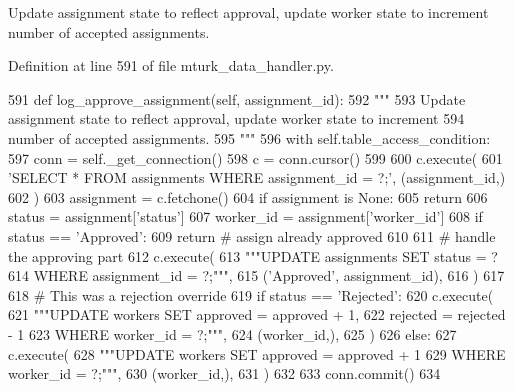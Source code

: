 \begin{DoxyVerb}Update assignment state to reflect approval, update worker state to increment
number of accepted assignments.
\end{DoxyVerb}
 

Definition at line 591 of file mturk\+\_\+data\+\_\+handler.\+py.


\begin{DoxyCode}
591     \textcolor{keyword}{def }log\_approve\_assignment(self, assignment\_id):
592         \textcolor{stringliteral}{"""}
593 \textcolor{stringliteral}{        Update assignment state to reflect approval, update worker state to increment}
594 \textcolor{stringliteral}{        number of accepted assignments.}
595 \textcolor{stringliteral}{        """}
596         with self.table\_access\_condition:
597             conn = self.\_get\_connection()
598             c = conn.cursor()
599 
600             c.execute(
601                 \textcolor{stringliteral}{'SELECT * FROM assignments WHERE assignment\_id = ?;'}, (assignment\_id,)
602             )
603             assignment = c.fetchone()
604             \textcolor{keywordflow}{if} assignment \textcolor{keywordflow}{is} \textcolor{keywordtype}{None}:
605                 \textcolor{keywordflow}{return}
606             status = assignment[\textcolor{stringliteral}{'status'}]
607             worker\_id = assignment[\textcolor{stringliteral}{'worker\_id'}]
608             \textcolor{keywordflow}{if} status == \textcolor{stringliteral}{'Approved'}:
609                 \textcolor{keywordflow}{return}  \textcolor{comment}{# assign already approved}
610 
611             \textcolor{comment}{# handle the approving part}
612             c.execute(
613                 \textcolor{stringliteral}{"""UPDATE assignments SET status = ?}
614 \textcolor{stringliteral}{                         WHERE assignment\_id = ?;"""},
615                 (\textcolor{stringliteral}{'Approved'}, assignment\_id),
616             )
617 
618             \textcolor{comment}{# This was a rejection override}
619             \textcolor{keywordflow}{if} status == \textcolor{stringliteral}{'Rejected'}:
620                 c.execute(
621                     \textcolor{stringliteral}{"""UPDATE workers SET approved = approved + 1,}
622 \textcolor{stringliteral}{                             rejected = rejected - 1}
623 \textcolor{stringliteral}{                             WHERE worker\_id = ?;"""},
624                     (worker\_id,),
625                 )
626             \textcolor{keywordflow}{else}:
627                 c.execute(
628                     \textcolor{stringliteral}{"""UPDATE workers SET approved = approved + 1}
629 \textcolor{stringliteral}{                             WHERE worker\_id = ?;"""},
630                     (worker\_id,),
631                 )
632 
633             conn.commit()
634 
\end{DoxyCode}
